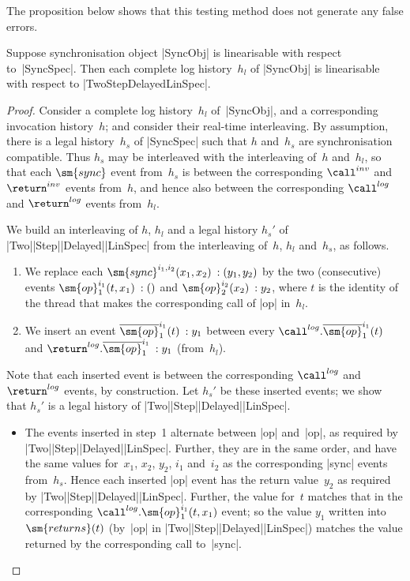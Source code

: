 The proposition below shows that this testing method does not generate any false
errors. 
%
\begin{prop}
Suppose synchronisation object |SyncObj| is linearisable with respect
to~|SyncSpec|.  Then each complete log history~$h_l$ of |SyncObj| is
linearisable with respect to |TwoStepDelayedLinSpec|.
\end{prop}


\begin{proof}
Consider a complete log history~$h_l$ of~|SyncObj|, and a corresponding
invocation history~$h$; and consider their real-time interleaving.  By
assumption, there is a legal history~$h_s$ of |SyncSpec| such that $h$
and~$h_s$ are synchronisation compatible.  Thus $h_s$ may be interleaved with
the interleaving of~$h$ and~$h_l$, so that each $\sm{sync}$ event from~$h_s$
is between the corresponding $\call^{inv}$ and $\return^{inv}$ events
from~$h$, and hence also between the corresponding $\call^{log}$ and
$\return^{log}$ events from~$h_l$.

We build an interleaving of $h$, $h_l$ and a legal history $h_s'$ of
|Two|\-|Step|\-|Delayed|\-|LinSpec| from the interleaving of~$h$, $h_l$
and~$h_s$, as follows.
%
\begin{enumerate}
\item We replace each $\sm{sync}^{i_1,i_2}(x_1,x_2) \:: (y_1,y_2)$ by
  the two (consecutive) events $\sm{op}_1^{i_1}(t,x_1) \:: ()$ and
  $\sm{op}_2^{i_2}(x_2) \:: y_2$, where $t$ is the identity of the thread that
  makes the corresponding call of |op| in~$h_l$.  

\item We insert an event $\overline{\sm{op}}_1^{i_1}(t) \:: y_1$ between every
  $\call^{log}.\overline{\sm{op}}_1^{i_1}(t)$ and
  $\return^{log}.\overline{\sm{op}}_1^{i_1} \:: y_1$ (from~$h_l$).
\end{enumerate}
%
Note that each inserted event is between the corresponding $\call^{log}$ and
$\return^{log}$ events, by construction.  Let $h_s'$ be these inserted events;
we show that $h_s'$ is a legal history of |Two|\-|Step|\-|Delayed|\-|LinSpec|.
\begin{itemize}
\item The events inserted in step~1 alternate between |op| and~|op|, as
  required by |Two|\-|Step|\-|Delayed|\-|LinSpec|.  Further, they are in the
  same order, and have the same values for~$x_1$, $x_2$, $y_2$, $i_1$
  and~$i_2$ as the corresponding |sync| events from~$h_s$.  Hence each
  inserted |op| event has the return value~$y_2$ as required by
  |Two|\-|Step|\-|Delayed|\-|LinSpec|.  Further, the value for~$t$ matches
  that in the corresponding $\call^{log}.\sm{op}_1^{i_1}(t,x_1)$ event; so
  the value $y_1$ written into $\sm{returns}(t)$ (by~|op| in
  |Two|\-|Step|\-|Delayed|\-|LinSpec|) matches the value returned by the
  corresponding call to~|sync|.


\end{itemize}
\end{proof}
